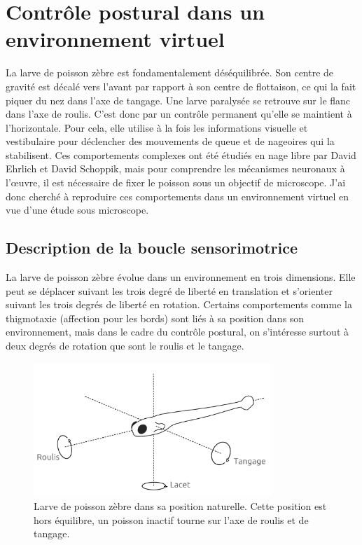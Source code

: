 \chapter{Contrôle postural dans un environnement virtuel}\label{chapII}

La larve de poisson zèbre est fondamentalement déséquilibrée. Son centre de gravité est décalé vers l'avant par rapport à son centre de flottaison, ce qui la fait piquer du nez dans l'axe de tangage. Une larve paralysée se retrouve sur le flanc dans l'axe de roulis. C'est donc par un contrôle permanent qu'elle se maintient à l'horizontale. Pour cela, elle utilise à la fois les informations visuelle et vestibulaire pour déclencher des mouvements de queue et de nageoires qui la stabilisent. Ces comportements complexes ont été étudiés en nage libre par David Ehrlich et David Schoppik, mais pour comprendre les mécanismes neuronaux à l'œuvre, il est nécessaire de fixer le poisson sous un objectif de microscope. J'ai donc cherché à reproduire ces comportements dans un environnement virtuel en vue d'une étude sous microscope.

\section{Description de la boucle sensorimotrice}

La larve de poisson zèbre évolue dans un environnement en trois dimensions. Elle peut se déplacer suivant les trois degré de liberté en translation et s'orienter suivant les trois degrés de liberté en rotation. Certains comportements comme la thigmotaxie (affection pour les bords) sont liés à sa position dans son environnement, mais dans le cadre du contrôle postural, on s'intéresse surtout à deux degrés de rotation que sont le roulis et le tangage.

\begin{figure}
\centering
\includegraphics[width=0.8\textwidth]{./files/fish.png}
\caption{Larve de poisson zèbre dans sa position naturelle. Cette position est hors équilibre, un poisson inactif tourne sur l'axe de roulis et de tangage.}
\end{figure}

